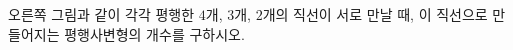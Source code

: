\hspace*{2mm}\begin{minipage}[t]{\dimexpr\linewidth-2mm\relax}\vspace{0pt}
\noindent\begin{minipage}[t]{0.58\linewidth}\vspace{0pt}\raggedright 오른쪽 그림과 같이 각각 평행한 $4$개, $3$개, $2$개의 직선이 서로 만날 때, 이 직선으로 만들어지는 평행사변형의 개수를 구하시오.\end{minipage}\hfill\begin{minipage}[t]{0.4\linewidth}\vspace{0pt}\centering \resizebox{\ifdim\width>\linewidth\linewidth\else\width\fi}{!}{}\end{minipage}\par\end{minipage}
